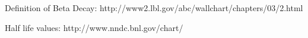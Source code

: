 \begin{thebibliography}{99}
	 Definition of Beta Decay: http://www2.lbl.gov/abc/wallchart/chapters/03/2.html

	 Half life values: http://www.nndc.bnl.gov/chart/

\end{thebibliography}